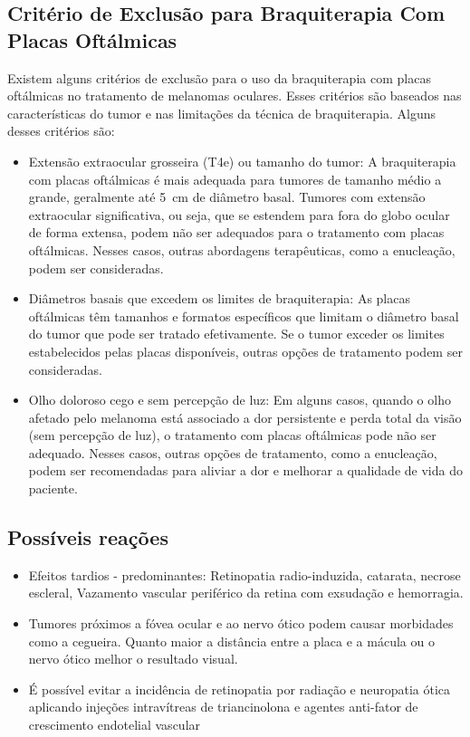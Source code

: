 \documentclass[11pt,a4paper]{article}
\begin{document}
\subsection*{Critério de Exclusão para Braquiterapia Com Placas Oftálmicas}

    Existem alguns critérios de exclusão para o uso da braquiterapia com placas oftálmicas no tratamento de melanomas oculares. Esses critérios são baseados nas características do tumor e nas limitações da técnica de braquiterapia. Alguns desses critérios são:

    \begin{itemize}
        \item Extensão extraocular grosseira (T4e) ou tamanho do tumor: A braquiterapia com placas oftálmicas é mais adequada para tumores de tamanho médio a grande, geralmente até \SI{5}{\centi\meter} de diâmetro basal. Tumores com extensão extraocular significativa, ou seja, que se estendem para fora do globo ocular de forma extensa, podem não ser adequados para o tratamento com placas oftálmicas. Nesses casos, outras abordagens terapêuticas, como a enucleação, podem ser consideradas.
        
        \item Diâmetros basais que excedem os limites de braquiterapia: As placas oftálmicas têm tamanhos e formatos específicos que limitam o diâmetro basal do tumor que pode ser tratado efetivamente. Se o tumor exceder os limites estabelecidos pelas placas disponíveis, outras opções de tratamento podem ser consideradas.
        
        \item Olho doloroso cego e sem percepção de luz: Em alguns casos, quando o olho afetado pelo melanoma está associado a dor persistente e perda total da visão (sem percepção de luz), o tratamento com placas oftálmicas pode não ser adequado. Nesses casos, outras opções de tratamento, como a enucleação, podem ser recomendadas para aliviar a dor e melhorar a qualidade de vida do paciente.
        \end{itemize}

\subsection*{Possíveis reações}


    \begin{itemize}
        \item Efeitos tardios - predominantes: Retinopatia radio-induzida, catarata, necrose escleral, Vazamento vascular periférico da retina com exsudação e hemorragia.
        \item Tumores próximos a fóvea ocular e ao nervo ótico podem causar morbidades como a cegueira. Quanto maior a distância entre a placa e a mácula ou o nervo ótico melhor o resultado visual.
        \item É possível evitar a incidência de retinopatia por radiação e neuropatia ótica aplicando injeções intravítreas de triancinolona e agentes anti-fator de crescimento endotelial vascular
    \end{itemize}
\end{document}
